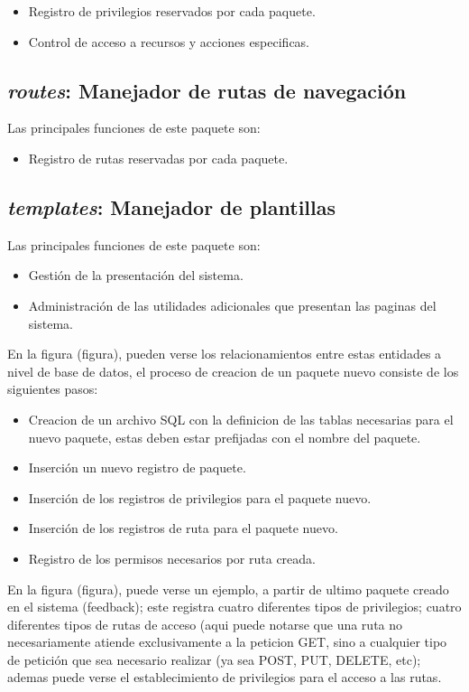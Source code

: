 \begin{itemize}
\item Registro de privilegios reservados por cada paquete.
\item Control de acceso a recursos y acciones especificas.
\end{itemize}

\subsection{\emph{routes}: Manejador de rutas de navegación}
Las principales funciones de este paquete son:

\begin{itemize}
\item Registro de rutas reservadas por cada paquete.
\end{itemize}

\subsection{\emph{templates}: Manejador de plantillas}
Las principales funciones de este paquete son:

\begin{itemize}
\item Gestión de la presentación del sistema.
\item Administración de las utilidades adicionales que presentan las paginas
del sistema.
\end{itemize}

En la figura (figura), pueden verse los relacionamientos entre estas entidades a
nivel de base de datos, el proceso de creacion de un paquete nuevo consiste de
los siguientes pasos:

\begin{itemize}
\item Creacion de un archivo SQL con la definicion de las tablas necesarias para
el nuevo paquete, estas deben estar prefijadas con el nombre del paquete.
\item Inserción un nuevo registro de paquete.
\item Inserción de los registros de privilegios para el paquete nuevo.
\item Inserción de los registros de ruta para el paquete nuevo.
\item Registro de los permisos necesarios por ruta creada.
\end{itemize}

En la figura (figura), puede verse un ejemplo, a partir de ultimo paquete creado
en el sistema (feedback); este registra cuatro diferentes tipos de privilegios;
cuatro diferentes tipos de rutas de acceso (aqui puede notarse que una ruta no
necesariamente atiende exclusivamente a la peticion GET, sino a cualquier tipo
de petición que sea necesario realizar (ya sea POST, PUT, DELETE, etc); ademas
puede verse el establecimiento de privilegios para el acceso a las rutas.

